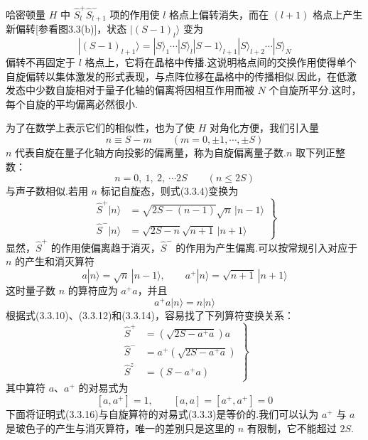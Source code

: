 哈密顿量 $H$ 中 $\hat{S}_l^{+}\hat{S}_{l+1}^{-}$ 项的作用使 $l$ 格点上偏转消失，而在 $(l+1)$
格点上产生新偏转[参看图3.3(b)]，状态 $|(S-1)_l\rangle$ 变为
\begin{equation*}
  |(S-1)_{l+1}\rangle=|S\rangle_1\cdots|S\rangle_l|S-1\rangle_{l+1}|S\rangle_{l+2}\cdots|S\rangle_N
\end{equation*}
偏转不再固定于 $l$ 格点上，它将在晶格中传播.这说明格点间的交换作用使得单个自旋偏转以集体激发的形式表现，与点阵位移在晶格中的传播相似.因此，在低激发态中少数自旋相对于量子化轴的偏离将因相互作用而被
$N$ 个自旋所平分.这时，每个自旋的平均偏离必然很小.

为了在数学上表示它们的相似性，也为了使 $H$ 对角化方便，我们引入量
\begin{equation}
  n\equiv S-m\qquad\left(m=0,\pm1,\cdots,\pm S\right)
\end{equation}
$n$ 代表自旋在量子化轴方向投影的偏离量，称为自旋偏离量子数.$n$ 取下列正整数：
\begin{equation}
  n=0,\ 1,\ 2,\ \cdots 2S\qquad\left(n\leqslant2S\right)
\end{equation}
与声子数相似.若用 $n$ 标记自旋态，则式(3.3.4)变换为
\begin{equation}
  \left.\begin{aligned}
    \hat{S}^{+}|n\rangle&=\sqrt{2S-(n-1)}\sqrt{n}\,|n-1\rangle\\
    \hat{S}^{-}|n\rangle&=\sqrt{2S-n}\sqrt{n+1}\,|n+1\rangle
  \end{aligned}\right\}
\end{equation}
显然，$\hat{S}^{+}$ 的作用使偏离趋于消灭，$\hat{S}^{-}$ 的作用为产生偏离.可以按常规引入对应于 $n$ 的产生和消灭算符
\begin{equation}
  a|n\rangle=\sqrt{n}\,|n-1\rangle,\qquad a^{+}|n\rangle=\sqrt{n+1}\,|n+1\rangle
\end{equation}
这时量子数 $n$ 的算符应为 $a^{+}a$，并且
\begin{equation}
  a^{+}a|n\rangle=n|n\rangle
\end{equation}
根据式(3.3.10)、(3.3.12)和(3.3.14)，容易找了下列算符变换关系：
\begin{equation}
  \left.\begin{aligned}
    \hat{S}^{+}&=\left(\sqrt{2S-a^{+}a}\right)a\\
    \hat{S}^{-}&=a^{+}\left(\sqrt{2S-a^{+}a}\right)\\
    \hat{S}^{z}&=\left(S-a^{+}a\right)
  \end{aligned}\right\}
\end{equation}
其中算符 $a$、$a^{+}$ 的对易式为
\begin{equation}
  \left[a,a^{+}\right]=1,\qquad\left[a,a\right]=\left[a^{+},a^{+}\right]=0
\end{equation}
下面将证明式(3.3.16)与自旋算符的对易式(3.3.3)是等价的.我们可以认为 $a^{+}$ 与 $a$
是玻色子的产生与消灭算符，唯一的差别只是这里的 $n$ 有限制，它不能超过 $2S$.

